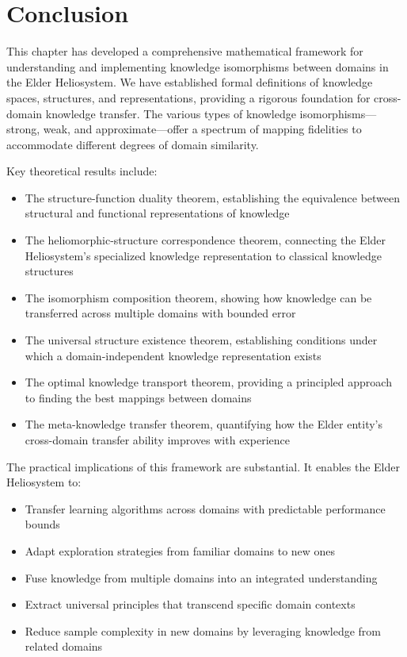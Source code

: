 \section{Conclusion}

This chapter has developed a comprehensive mathematical framework for understanding and implementing knowledge isomorphisms between domains in the Elder Heliosystem. We have established formal definitions of knowledge spaces, structures, and representations, providing a rigorous foundation for cross-domain knowledge transfer. The various types of knowledge isomorphisms—strong, weak, and approximate—offer a spectrum of mapping fidelities to accommodate different degrees of domain similarity.

Key theoretical results include:
\begin{itemize}
    \item The structure-function duality theorem, establishing the equivalence between structural and functional representations of knowledge
    \item The heliomorphic-structure correspondence theorem, connecting the Elder Heliosystem's specialized knowledge representation to classical knowledge structures
    \item The isomorphism composition theorem, showing how knowledge can be transferred across multiple domains with bounded error
    \item The universal structure existence theorem, establishing conditions under which a domain-independent knowledge representation exists
    \item The optimal knowledge transport theorem, providing a principled approach to finding the best mappings between domains
    \item The meta-knowledge transfer theorem, quantifying how the Elder entity's cross-domain transfer ability improves with experience
\end{itemize}

The practical implications of this framework are substantial. It enables the Elder Heliosystem to:
\begin{itemize}
    \item Transfer learning algorithms across domains with predictable performance bounds
    \item Adapt exploration strategies from familiar domains to new ones
    \item Fuse knowledge from multiple domains into an integrated understanding
    \item Extract universal principles that transcend specific domain contexts
    \item Reduce sample complexity in new domains by leveraging knowledge from related domains
\end{itemize}

